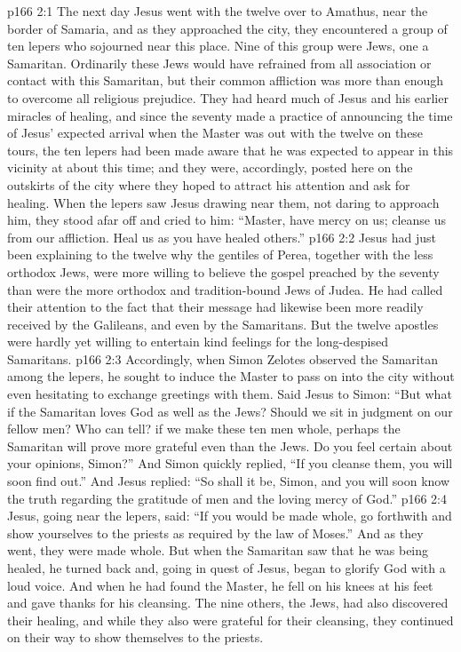 \vs p166 2:1 The next day Jesus went with the twelve over to Amathus, near the border of Samaria, and as they approached the city, they encountered a group of ten lepers who sojourned near this place. Nine of this group were Jews, one a Samaritan. Ordinarily these Jews would have refrained from all association or contact with this Samaritan, but their common affliction was more than enough to overcome all religious prejudice. They had heard much of Jesus and his earlier miracles of healing, and since the seventy made a practice of announcing the time of Jesus’ expected arrival when the Master was out with the twelve on these tours, the ten lepers had been made aware that he was expected to appear in this vicinity at about this time; and they were, accordingly, posted here on the outskirts of the city where they hoped to attract his attention and ask for healing. When the lepers saw Jesus drawing near them, not daring to approach him, they stood afar off and cried to him: “Master, have mercy on us; cleanse us from our affliction. Heal us as you have healed others.”
\vs p166 2:2 Jesus had just been explaining to the twelve why the gentiles of Perea, together with the less orthodox Jews, were more willing to believe the gospel preached by the seventy than were the more orthodox and tradition\hyp{}bound Jews of Judea. He had called their attention to the fact that their message had likewise been more readily received by the Galileans, and even by the Samaritans. But the twelve apostles were hardly yet willing to entertain kind feelings for the long\hyp{}despised Samaritans.
\vs p166 2:3 Accordingly, when Simon Zelotes observed the Samaritan among the lepers, he sought to induce the Master to pass on into the city without even hesitating to exchange greetings with them. Said Jesus to Simon: \textcolor{ubdarkred}{“But what if the Samaritan loves God as well as the Jews? Should we sit in judgment on our fellow men? Who can tell? if we make these ten men whole, perhaps the Samaritan will prove more grateful even than the Jews. Do you feel certain about your opinions, Simon?”} And Simon quickly replied, “If you cleanse them, you will soon find out.” And Jesus replied: \textcolor{ubdarkred}{“So shall it be, Simon, and you will soon know the truth regarding the gratitude of men and the loving mercy of God.”}
\vs p166 2:4 Jesus, going near the lepers, said: \textcolor{ubdarkred}{“If you would be made whole, go forthwith and show yourselves to the priests as required by the law of Moses.”} And as they went, they were made whole. But when the Samaritan saw that he was being healed, he turned back and, going in quest of Jesus, began to glorify God with a loud voice. And when he had found the Master, he fell on his knees at his feet and gave thanks for his cleansing. The nine others, the Jews, had also discovered their healing, and while they also were grateful for their cleansing, they continued on their way to show themselves to the priests.
